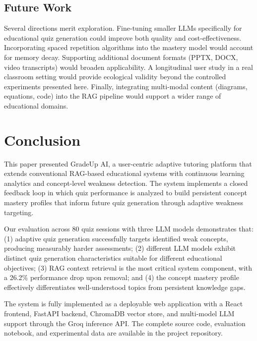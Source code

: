 \documentclass[runningheads]{llncs}
\begin{document}
\subsection{Future Work}

Several directions merit exploration. Fine-tuning smaller LLMs specifically for educational quiz generation could improve both quality and cost-effectiveness. Incorporating spaced repetition algorithms into the mastery model would account for memory decay. Supporting additional document formats (PPTX, DOCX, video transcripts) would broaden applicability. A longitudinal user study in a real classroom setting would provide ecological validity beyond the controlled experiments presented here. Finally, integrating multi-modal content (diagrams, equations, code) into the RAG pipeline would support a wider range of educational domains.

\section{Conclusion}

This paper presented GradeUp AI, a user-centric adaptive tutoring platform that extends conventional RAG-based educational systems with continuous learning analytics and concept-level weakness detection. The system implements a closed feedback loop in which quiz performance is analyzed to build persistent concept mastery profiles that inform future quiz generation through adaptive weakness targeting.

Our evaluation across 80 quiz sessions with three LLM models demonstrates that: (1) adaptive quiz generation successfully targets identified weak concepts, producing measurably harder assessments; (2) different LLM models exhibit distinct quiz generation characteristics suitable for different educational objectives; (3) RAG context retrieval is the most critical system component, with a 26.2\% performance drop upon removal; and (4) the concept mastery profile effectively differentiates well-understood topics from persistent knowledge gaps.

The system is fully implemented as a deployable web application with a React frontend, FastAPI backend, ChromaDB vector store, and multi-model LLM support through the Groq inference API. The complete source code, evaluation notebook, and experimental data are available in the project repository.



\end{document}
